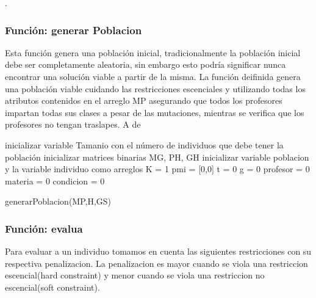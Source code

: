.

\subsubsection{Funci\'on: generar Poblacion}

Esta función genera una población inicial, tradicionalmente la población inicial debe ser completamente aleatoria, sin embargo esto podría significar nunca encontrar una solución viable a partir de la misma. La función deifinida genera una población viable cuidando  las restricciones escenciales y utilizando todas los atributos contenidos en el arreglo MP asegurando que todos los profesores impartan todas sus clases a pesar de las mutaciones, mientras se verifica que los profesores no tengan traslapes. A de

\begin{algorithm}[H]
	\DontPrintSemicolon
	\SetAlgoLined
	inicializar variable Tamanio con el n\'umero de individuos que debe tener la poblaci\'on\;
	inicializar matrices binarias MG, PH, GH\;
	inicializar variable poblacion y la variable individuo como arreglos\;
	K = 1\;
	pmi = [0,0] \;
	t = 0\;
	g = 0\;
	profesor = 0\;
	materia = 0\;
	condicion = 0\;
	
	\caption{generarPoblacion(MP,H,GS)}
\end{algorithm}

\subsubsection{Funci\'on: evalua}

Para evaluar a un individuo tomamos en cuenta las siguientes restricciones con su respectiva penalizacion. La penalizacion es mayor cuando se viola una restriccion escencial(hard constraint) y menor cuando se viola una restriccion no escencial(soft constraint).

